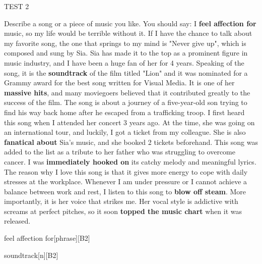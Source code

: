 \begin{glossarymc}[Cambridge 5]
\begin{test}{TEST 2}
\begin{qa}{Describe a song or a piece of music you like. You should say:}
        {I \textbf{feel affection for} music, so my life would be terrible without it. If I have the chance to talk about my favorite song, the one that springs to my mind is "Never give up", which is composed and sung by Sia. Sia has made it to the top as a prominent figure in music industry, and I have been a huge fan of her for 4 years. Speaking of the song, it is the \textbf{soundtrack} of the film titled "Lion" and it was nominated for a Grammy award for the best song written for Visual Media. It is one of her \textbf{massive hits}, and many moviegoers believed that it contributed greatly to the success of the film. The song is about a journey of a five-year-old son trying to find his way back home after he escaped from a trafficking troop. I first heard this song when I attended her concert 3 years ago. At the time, she was going on an international tour, and luckily, I got a ticket from my colleague. She is also \textbf{fanatical about} Sia's music, and she booked 2 tickets beforehand. This song was added to the list as a tribute to her father who was struggling to overcome cancer. I was \textbf{immediately hooked on} its catchy melody and meaningful lyrics. The reason why I love this song is that it gives more energy to cope with daily stresses at the workplace. Whenever I am under pressure or I cannot achieve a balance between work and rest, I listen to this song to \textbf{blow off steam}. More importantly, it is her voice that strikes me. Her vocal style is addictive with screams at perfect pitches, so it soon \textbf{topped the music chart} when it was released.}
    \end{qa}

        \begin{VocabExplain}[Part 2]
            \begin{ExplainCard}{feel affection for}[phrase][B2]
            \end{ExplainCard}

            \begin{ExplainCard}{soundtrack}[n][B2]
            \end{ExplainCard}


\end{VocabExplain}
\end{test}
\end{glossarymc}
